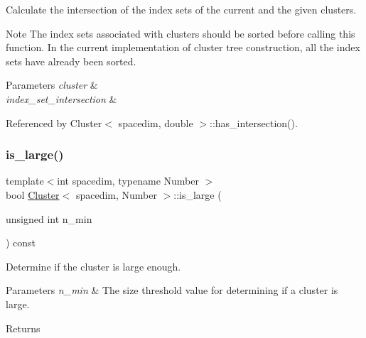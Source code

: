 Calculate the intersection of the index sets of the current and the given clusters.


\begin{DoxyDescription}
\item[Note ]The index sets associated with clusters should be sorted before calling this function. In the current implementation of cluster tree construction, all the index sets have already been sorted. 
\end{DoxyDescription}
\begin{DoxyParams}{Parameters}
{\em cluster} & \\
\hline
{\em index\+\_\+set\+\_\+intersection} & \\
\hline
\end{DoxyParams}


Referenced by Cluster$<$ spacedim, double $>$\+::has\+\_\+intersection().

\mbox{\label{classCluster_a55c608dd38d185c394e516d106fea02a}} 
\subsubsection{\texorpdfstring{is\+\_\+large()}{is\_large()}}
{\footnotesize\ttfamily template$<$int spacedim, typename Number $>$ \\
bool \hyperlink{classCluster}{Cluster}$<$ spacedim, Number $>$\+::is\+\_\+large (\begin{DoxyParamCaption}\item[{unsigned int}]{n\+\_\+min }\end{DoxyParamCaption}) const}

Determine if the cluster is large enough.


\begin{DoxyParams}{Parameters}
{\em n\+\_\+min} & The size threshold value for determining if a cluster is large. \\
\hline
\end{DoxyParams}
\begin{DoxyReturn}{Returns}

\end{DoxyReturn}
\mbox{\label{classCluster_aaf45b6f7d9e629dd2fe648dd0231a559}} 
